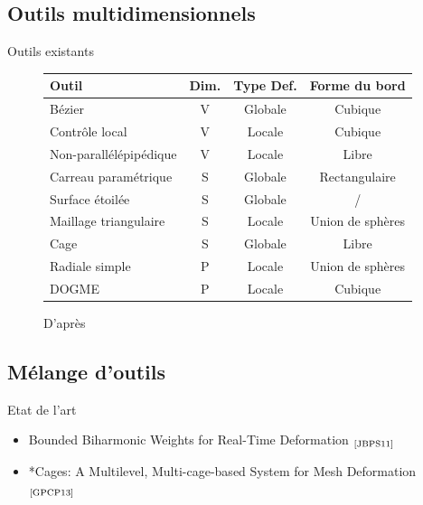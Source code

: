 \documentclass[xcolor=x11names,compress]{beamer}
\renewcommand{\(}{\begin{columns}} \renewcommand{\)}{\end{columns}}
\newcommand{\<}[1]{\begin{column}{#1}} \renewcommand{\>}{\end{column}}
\begin{document}
\subsection{Outils multidimensionnels}
\begin{frame}{Outils existants}


  \begin{figure}[h]
    \begin{center}
      \begin{tabular}{|l|c|c|c|}
        \hline
        \textbf{Outil} & \textbf{Dim.} & \textbf{Type Def.} & \textbf{Forme du bord} \\
        \hline
        \hline
        Bézier & V & Globale & Cubique\\
        \hline
        Contrôle local & V & Locale & Cubique\\
        \hline
        Non-parallélépipédique & V & Locale & Libre\\
        \hline
        \hline
        Carreau paramétrique & S & Globale & Rectangulaire\\
        \hline
        Surface étoilée & S & Globale & /\\
        \hline
        Maillage triangulaire & S & Locale & Union de sphères\\
        \hline
        Cage & S & Globale & Libre\\
        \hline
        \hline
        Radiale simple & P & Locale & Union de sphères\\
        \hline
        DOGME & P & Locale & Cubique\\
        \hline
      \end{tabular}
      \caption{D'après \cite{GB08}}
    \end{center}
  \end{figure}
\end{frame}

\subsection{Mélange d'outils}

\begin{frame}{Etat de l'art}
  \begin{itemize}
  \item Bounded Biharmonic Weights for Real-Time Deformation
    $_{\text{\cite{JBPS11}}}$
  \item *Cages: A Multilevel, Multi-cage-based System for Mesh
      Deformation $_{\text{\cite{GPCP13}}}$
  \end{itemize}
\end{frame}
\end{document}
